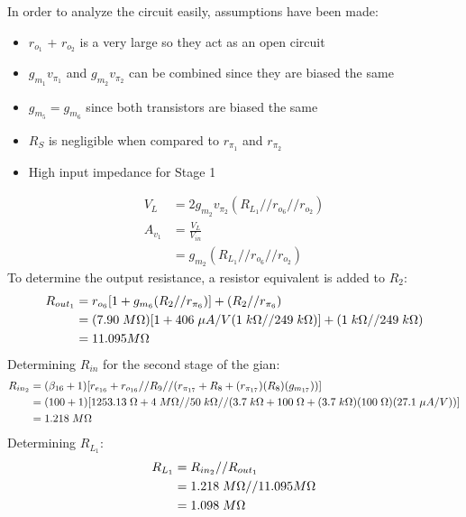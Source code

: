 \documentclass{article}
\begin{document}
	\noindent In order to analyze the circuit easily, assumptions have been made:
	\begin{itemize}
		\item $r_{o_1}$ + $r_{o_2}$ is a very large so they act as an open circuit
		\item $g_{m_1} v_{\pi_1}$ and $g_{m_2} v_{\pi_2}$ can be combined since they are biased the same
		\item $g_{m_5} = g_{m_6}$ since both transistors are biased the same
		\item $R_S$ is negligible when compared to $r_{\pi_1}$ and $r_{\pi_2}$
		\item High input impedance for Stage 1
	\end{itemize}
	\begin{align*}
		V_L &= 2 g_{m_2} v_{\pi_2} (R_{L_1} // r_{o_6} // r_{o_2})\\
		A_{v_1} &= \frac{V_L}{V_{in}}\\
		&= g_{m_2} (R_{L_1} // r_{o_6} // r_{o_2})
	\end{align*}
	To determine the output resistance, a resistor equivalent is added to $R_2$:
	\begin{align*}
		R_{out_1} &= r_{o_6} [1 + g_{m_6} (R_2 // r_{\pi_6})] + (R_2 // r_{\pi_6})\\
		&= (7.90 \hspace{1mm} M\Omega) [1 + 406 \hspace{1mm}\mu A/V (1 \hspace{1mm} k\Omega // 249 \hspace{1mm} k\Omega)] + (1 \hspace{1mm} k\Omega // 249 \hspace{1mm} k\Omega)\\
		&= 11.095 M\Omega 
	\end{align*}
	Determining $R_{in}$ for the second stage of the gian:
	\begin{align*}
		R_{in_2} &= (\beta_{16} + 1) [r_{e_{16}} + r_{o_{16}} // R_9 // (r_{\pi_{17}} + R_8 + (r_{\pi_{17}}) (R_8) (g_{m_{17}}))]\\
		&= (100 + 1)[1253.13 \hspace{1mm} \Omega + 4 \hspace{1mm} M\Omega // 50 \hspace{1mm} k\Omega // (3.7 \hspace{1mm} k\Omega + 100 \hspace{1mm} \Omega + (3.7 \hspace{1mm} k\Omega)(100 \hspace{1mm} \Omega)(27.1 \hspace{1mm} \mu A/V) )]\\
		&= 1.218 \hspace{1mm} M\Omega
	\end{align*}
	Determining $R_{L_1}$:
	\begin{align*}
		R_{L_1} &= R_{in_2} // R_{out_1}\\
		&= 1.218 \hspace{1mm} M\Omega // 11.095 M\Omega\\
		&= 1.098 \hspace{1mm} M\Omega
	\end{align*}
	
\end{document}
